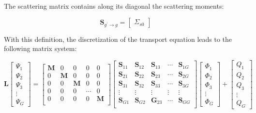 \documentclass[10pt]{article}
\begin{document}
The scattering matrix contains along its diagonal the scattering moments:

\begin{equation}
\textbf{S}_{g^{'}\rightarrow g}=\begin{bmatrix}
\Sigma_{s0}
\end{bmatrix}
\end{equation}

With this definition, the discretization of the transport equation leads to the following matrix system:

\begin{equation}
\textbf{L}\begin{bmatrix}\Psi_1\\\Psi_2\\\Psi_3\\\vdots\\\Psi_G\end{bmatrix}=
\begin{bmatrix}
\textbf{M} & 0 & 0 & 0 & 0\\
0 & \textbf{M} & 0 & 0 & 0\\
0 & 0 & \textbf{M} & 0 & 0\\
0 & 0 & 0 & \cdots & 0\\
0 & 0 & 0 & 0 & \textbf{M}\\
\end{bmatrix}
\begin{bmatrix}
\textbf{S}_{11} & \textbf{S}_{12} & \textbf{S}_{13} & \cdots & \textbf{S}_{1G}\\
\textbf{S}_{21} & \textbf{S}_{22} & \textbf{S}_{23} & \cdots & \textbf{S}_{2G}\\
\textbf{S}_{31} & \textbf{S}_{32} & \textbf{S}_{33} & \cdots & \textbf{S}_{3G}\\
\vdots & \vdots & \vdots & \vdots & \vdots\\
\textbf{S}_{G1} & \textbf{S}_{G2} & \textbf{G}_{23} & \cdots & \textbf{S}_{GG}\\
\end{bmatrix}
\begin{bmatrix}
\Phi_1\\\Phi_2\\\Phi_3\\\vdots\\\Phi_G
\end{bmatrix}
+
\begin{bmatrix}
Q_1\\Q_2\\Q_3\\\vdots\\Q_G
\end{bmatrix}
\end{equation}
\end{document}
